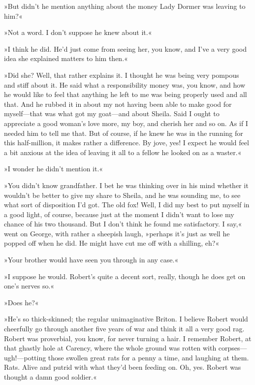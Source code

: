 »But didn't he mention anything about the money Lady Dormer was leaving to him?«

»Not a word. I don't suppose he knew about it.«

»I think he did. He'd just come from seeing her, you know, and I've a very good idea she explained matters to him then.«

»Did she? Well, that rather explains it. I thought he was being very pompous and stiff about it. He said what a responsibility money was, you know, and how he would like to feel that anything he left to me was being properly used and all that. And he rubbed it in about my not having been able to make good for myself\allowbreak---\allowbreak that was what got my goat\allowbreak---\allowbreak and about Sheila. Said I ought to appreciate a good woman's love more, my boy, and cherish her and so on. As if I needed him to tell me that. But of course, if he knew he was in the running for this half-million, it makes rather a difference. By jove, yes! I expect he would feel a bit anxious at the idea of leaving it all to a fellow he looked on as a waster.«

»I wonder he didn't mention it.«

»You didn't know grandfather. I bet he was thinking over in his mind whether it wouldn't be better to give my share to Sheila, and he was sounding me, to see what sort of disposition I'd got. The old fox! Well, I did my best to put myself in a good light, of course, because just at the moment I didn't want to lose my chance of his two thousand. But I don't think he found me satisfactory. I say,« went on George, with rather a sheepish laugh, »perhaps it's just as well he popped off when he did. He might have cut me off with a shilling, eh?«

»Your brother would have seen you through in any case.«

»I suppose he would. Robert's quite a decent sort, really, though he does get on one's nerves so.«

»Does he?«

»He's so thick-skinned; the regular unimaginative Briton. I believe Robert would cheerfully go through another five years of war and think it all a very good rag. Robert was proverbial, you know, for never turning a hair. I remember Robert, at that ghastly hole at Carency, where the whole ground was rotten with corpses\allowbreak---\allowbreak ugh!---potting those swollen great rats for a penny a time, and laughing at them. Rats. Alive and putrid with what they'd been feeding on. Oh, yes. Robert was thought a damn good soldier.«

